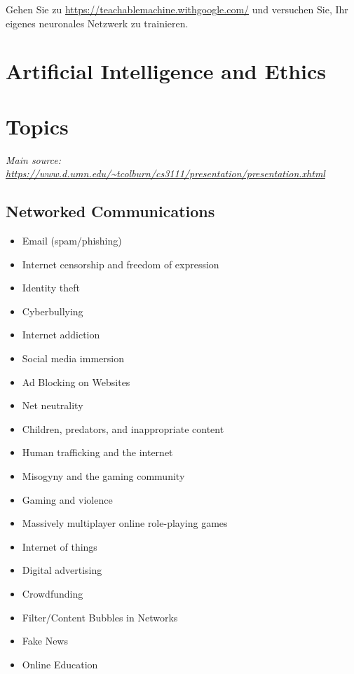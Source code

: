 \documentclass[12pt,a4paper]{report}
\begin{document}
\begin{ex}
     Gehen Sie zu \url{https://teachablemachine.withgoogle.com/} und versuchen Sie, Ihr eigenes neuronales Netzwerk zu trainieren.
\end{ex}


\newpage


\section*{Artificial Intelligence and Ethics}





\section*{Topics}
\emph{Main source: \url{https://www.d.umn.edu/~tcolburn/cs3111/presentation/presentation.xhtml}}
\subsection*{Networked Communications}
\begin{itemize}
\item Email (spam/phishing)
\item Internet censorship and freedom of expression
\item Identity theft
\item Cyberbullying
\item Internet addiction
\item Social media immersion
\item Ad Blocking on Websites
\item Net neutrality
\item Children, predators, and inappropriate content
\item Human trafficking and the internet
\item Misogyny and the gaming community
\item Gaming and violence
\item Massively multiplayer online role-playing games
\item Internet of things
\item Digital advertising
\item Crowdfunding
\item Filter/Content Bubbles in Networks
\item Fake News
\item Online Education
\end{itemize}
\end{document}
